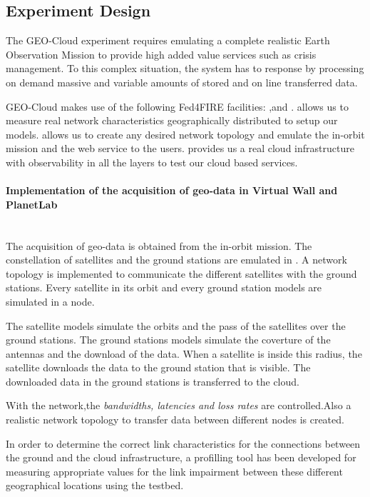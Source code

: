 \subsection{Experiment Design}


The GEO-Cloud experiment requires emulating a complete realistic Earth Observation Mission to provide high added value services such as crisis management. To this complex situation, the system has to response by processing on demand massive and variable amounts of stored and on line transferred data.

GEO-Cloud makes use of the following Fed4FIRE facilities: \pl,\vw and
\bonfire. \pl allows us to measure real network characteristics geographically
distributed to setup our models. \vw allows us to create any desired network
topology and emulate the in-orbit mission and the web service to the
users. \bonfire provides us a real cloud infrastructure with observability in
all the layers to test our cloud based services.


\paragraph{Implementation of the acquisition of geo-data in Virtual Wall and
  PlanetLab}~\\
The acquisition of geo-data is obtained from the in-orbit mission. The
constellation of satellites and the ground stations are emulated in \vw. A
network topology is implemented to communicate the different satellites with the ground stations. Every satellite in its orbit and every ground station models are simulated in a node.

The satellite models simulate the orbits and the pass of the satellites over the ground stations. The ground stations models simulate the coverture of the antennas and the download of the data. When a satellite is inside this radius, the satellite downloads the data to the ground station that is visible. The downloaded data in the ground stations is transferred to the \bonfire cloud.

With the \vw network,the \emph{bandwidths, latencies and loss rates} are
controlled.Also a realistic network topology to transfer data between different
nodes is created.

In order to determine the correct link characteristics for the connections
between the ground and the cloud infrastructure, a profilling tool has been
developed for measuring appropriate values for the link impairment between these different geographical locations using the \pl testbed.


